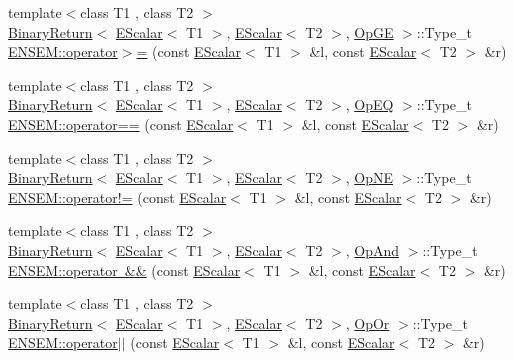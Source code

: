 \begin{DoxyCompactItemize}
{\footnotesize template$<$class T1 , class T2 $>$ }\\\mbox{\hyperlink{structENSEM_1_1BinaryReturn}{Binary\+Return}}$<$ \mbox{\hyperlink{classENSEM_1_1EScalar}{E\+Scalar}}$<$ T1 $>$, \mbox{\hyperlink{classENSEM_1_1EScalar}{E\+Scalar}}$<$ T2 $>$, \mbox{\hyperlink{structENSEM_1_1OpGE}{Op\+GE}} $>$\+::Type\+\_\+t \mbox{\hyperlink{group__escalar_ga9635179278abcc85536b21baae58904d}{E\+N\+S\+E\+M\+::operator$>$=}} (const \mbox{\hyperlink{classENSEM_1_1EScalar}{E\+Scalar}}$<$ T1 $>$ \&l, const \mbox{\hyperlink{classENSEM_1_1EScalar}{E\+Scalar}}$<$ T2 $>$ \&r)
\item 
{\footnotesize template$<$class T1 , class T2 $>$ }\\\mbox{\hyperlink{structENSEM_1_1BinaryReturn}{Binary\+Return}}$<$ \mbox{\hyperlink{classENSEM_1_1EScalar}{E\+Scalar}}$<$ T1 $>$, \mbox{\hyperlink{classENSEM_1_1EScalar}{E\+Scalar}}$<$ T2 $>$, \mbox{\hyperlink{structENSEM_1_1OpEQ}{Op\+EQ}} $>$\+::Type\+\_\+t \mbox{\hyperlink{group__escalar_gaccee099471047aac753f8acd2336898c}{E\+N\+S\+E\+M\+::operator==}} (const \mbox{\hyperlink{classENSEM_1_1EScalar}{E\+Scalar}}$<$ T1 $>$ \&l, const \mbox{\hyperlink{classENSEM_1_1EScalar}{E\+Scalar}}$<$ T2 $>$ \&r)
\item 
{\footnotesize template$<$class T1 , class T2 $>$ }\\\mbox{\hyperlink{structENSEM_1_1BinaryReturn}{Binary\+Return}}$<$ \mbox{\hyperlink{classENSEM_1_1EScalar}{E\+Scalar}}$<$ T1 $>$, \mbox{\hyperlink{classENSEM_1_1EScalar}{E\+Scalar}}$<$ T2 $>$, \mbox{\hyperlink{structENSEM_1_1OpNE}{Op\+NE}} $>$\+::Type\+\_\+t \mbox{\hyperlink{group__escalar_ga4d3acce68f40c5503e1e30f756a1ed4c}{E\+N\+S\+E\+M\+::operator!=}} (const \mbox{\hyperlink{classENSEM_1_1EScalar}{E\+Scalar}}$<$ T1 $>$ \&l, const \mbox{\hyperlink{classENSEM_1_1EScalar}{E\+Scalar}}$<$ T2 $>$ \&r)
\item 
{\footnotesize template$<$class T1 , class T2 $>$ }\\\mbox{\hyperlink{structENSEM_1_1BinaryReturn}{Binary\+Return}}$<$ \mbox{\hyperlink{classENSEM_1_1EScalar}{E\+Scalar}}$<$ T1 $>$, \mbox{\hyperlink{classENSEM_1_1EScalar}{E\+Scalar}}$<$ T2 $>$, \mbox{\hyperlink{structENSEM_1_1OpAnd}{Op\+And}} $>$\+::Type\+\_\+t \mbox{\hyperlink{group__escalar_ga8ca8cd66f3b104a6439afa608f4a6e50}{E\+N\+S\+E\+M\+::operator \&\&}} (const \mbox{\hyperlink{classENSEM_1_1EScalar}{E\+Scalar}}$<$ T1 $>$ \&l, const \mbox{\hyperlink{classENSEM_1_1EScalar}{E\+Scalar}}$<$ T2 $>$ \&r)
\item 
{\footnotesize template$<$class T1 , class T2 $>$ }\\\mbox{\hyperlink{structENSEM_1_1BinaryReturn}{Binary\+Return}}$<$ \mbox{\hyperlink{classENSEM_1_1EScalar}{E\+Scalar}}$<$ T1 $>$, \mbox{\hyperlink{classENSEM_1_1EScalar}{E\+Scalar}}$<$ T2 $>$, \mbox{\hyperlink{structENSEM_1_1OpOr}{Op\+Or}} $>$\+::Type\+\_\+t \mbox{\hyperlink{group__escalar_gadede5cc3683f39a01170f32e3f759c8e}{E\+N\+S\+E\+M\+::operator$\vert$$\vert$}} (const \mbox{\hyperlink{classENSEM_1_1EScalar}{E\+Scalar}}$<$ T1 $>$ \&l, const \mbox{\hyperlink{classENSEM_1_1EScalar}{E\+Scalar}}$<$ T2 $>$ \&r)

\end{DoxyCompactItemize}
